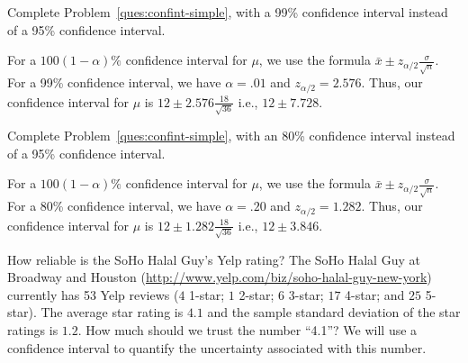 \documentclass[11pt]{exam}
\begin{document}
\begin{questions}

\question Complete Problem~\ref{ques:confint-simple}, with a 99\% confidence interval
instead of a 95\% confidence interval.

\begin{solution}
For a $100 (1 - \alpha) \%$ confidence interval for $\mu$, we use the formula
\(
  \bar x \pm z_{\alpha/2} \frac{\sigma}{\sqrt{n}}.
\)
For a 99\% confidence interval, we have $\alpha = .01$ and $z_{\alpha/2} =
2.576$.  Thus, our confidence interval for $\mu$ is
\(
  12 \pm 2.576 \frac{18}{\sqrt{36}}
\)
i.e.,
\(
  12 \pm 7.728. 
\)

\end{solution}



\question Complete Problem~\ref{ques:confint-simple}, with an 80\% confidence interval
instead of a 95\% confidence interval.

\begin{solution}
For a $100 (1 - \alpha) \%$ confidence interval for $\mu$, we use the formula
\(
  \bar x \pm z_{\alpha/2} \frac{\sigma}{\sqrt{n}}.
\)
For a 80\% confidence interval, we have $\alpha = .20$ and $z_{\alpha/2} =
1.282$.  Thus, our confidence interval for $\mu$ is
\(
  12 \pm 1.282 \frac{18}{\sqrt{36}}
\)
i.e.,
\(
  12 \pm 3.846.
\)

\end{solution}



\newpage

\question How reliable is the SoHo Halal Guy's Yelp rating? The SoHo Halal Guy
at Broadway and Houston
(\url{http://www.yelp.com/biz/soho-halal-guy-new-york}) currently has 53 Yelp
reviews ($4$ 1-star; $1$ 2-star; $6$ 3-star; $17$ 4-star; and $25$ 5-star).
The average star rating is $4.1$ and the sample standard deviation of the
star ratings is $1.2$. How much should we trust the number ``4.1''?  We will
use a confidence interval to quantify the uncertainty associated with this
number.

\end{questions}
\end{document}
